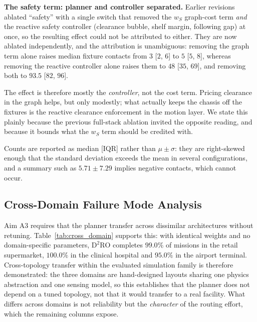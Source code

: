 \documentclass[journal]{IEEEtran}
\begin{document}
\textbf{The safety term: planner and controller separated.} Earlier revisions
ablated ``safety'' with a single switch that removed the $w_S$ graph-cost term
\emph{and} the reactive safety controller (clearance bubble, shelf margin, following
gap) at once, so the resulting effect could not be attributed to either. They are
now ablated independently, and the attribution is unambiguous: removing the graph
term alone raises median fixture contacts from $3$ [$2$, $6$] to $5$ [$5$, $8$],
whereas removing the reactive controller alone raises them to $48$ [$35$, $69$], and
removing both to $93.5$ [$82$, $96$].

The effect is therefore mostly the \emph{controller}, not the cost term. Pricing
clearance in the graph helps, but only modestly; what actually keeps the chassis off
the fixtures is the reactive clearance enforcement in the motion layer. We state
this plainly because the previous full-stack ablation invited the opposite reading,
and because it bounds what the $w_S$ term should be credited with.

Counts are reported as median [IQR] rather than $\mu \pm \sigma$: they are
right-skewed enough that the standard deviation exceeds the mean in several
configurations, and a summary such as $5.71 \pm 7.29$ implies negative contacts,
which cannot occur.





\subsection{Cross-Domain Failure Mode Analysis}
\label{sec:cross_domain_failure}
Aim A3 requires that the planner transfer across dissimilar architectures without retuning. Table~\ref{tab:cross_domain} supports this: with identical weights and no domain-specific parameters, $\text{D}^2\text{RO}$ completes $99.0\%$ of missions in the retail supermarket, $100.0\%$ in the clinical hospital and $95.0\%$ in the airport terminal. Cross-topology transfer within the evaluated simulation family is therefore demonstrated: the three domains are hand-designed layouts sharing one physics abstraction and one sensing model, so this establishes that the planner does not depend on a tuned topology, not that it would transfer to a real facility. What differs across domains is not reliability but the \emph{character} of the routing effort, which the remaining columns expose.
\end{document}
